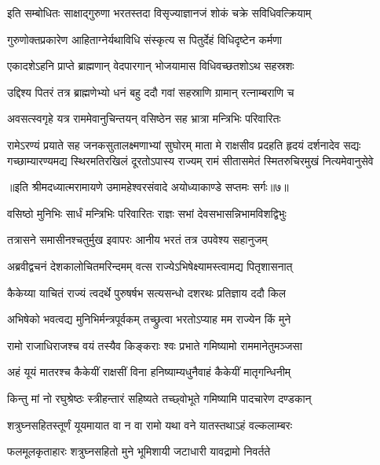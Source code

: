 \twolineshloka
{इति सम्बोधितः साक्षाद्गुरुणा भरतस्तदा}
{विसृज्याज्ञानजं शोकं चक्रे सविधिवत्क्रियाम्} %

\twolineshloka
{गुरुणोक्तप्रकारेण आहिताग्नेर्यथाविधि}
{संस्कृत्य स पितुर्देहं विधिदृष्टेन कर्मणा} %

\twolineshloka
{एकादशेऽहनि प्राप्ते ब्राह्मणान् वेदपारगान्}
{भोजयामास विधिवच्छतशोऽथ सहस्रशः} %

\twolineshloka
{उद्दिश्य पितरं तत्र ब्राह्मणेभ्यो धनं बहु}
{ददौ गवां सहस्राणि ग्रामान् रत्नाम्बराणि च} %

\twolineshloka
{अवसत्स्वगृहे यत्र राममेवानुचिन्तयन्}
{वसिष्ठेन सह भ्रात्रा मन्त्रिभिः परिवारितः} %

\fourlineindentedshloka
{रामेऽरण्यं प्रयाते सह जनकसुतालक्ष्मणाभ्यां सुघोरम्}
{माता मे राक्षसीव प्रदहति हृदयं दर्शनादेव सद्यः}
{गच्छाम्यारण्यमद्य स्थिरमतिरखिलं दूरतोऽपास्य राज्यम्}
{रामं सीतासमेतं स्मितरुचिरमुखं नित्यमेवानुसेवे} %

{॥इति श्रीमदध्यात्मरामायणे उमामहेश्वरसंवादे
अयोध्याकाण्डे सप्तमः सर्गः॥७॥
}




\twolineshloka
{वसिष्ठो मुनिभिः सार्धं मन्त्रिभिः परिवारितः}
{राज्ञः सभां देवसभासन्निभामविशद्विभुः} %

\twolineshloka
{तत्रासने समासीनश्चतुर्मुख इवापरः}
{आनीय भरतं तत्र उपवेश्य सहानुजम्} %

\twolineshloka
{अब्रवीद्वचनं देशकालोचितमरिन्दमम्}
{वत्स राज्येऽभिषेक्ष्यामस्त्वामद्य पितृशासनात्} %

\twolineshloka
{कैकेय्या याचितं राज्यं त्वदर्थे पुरुषर्षभ}
{सत्यसन्धो दशरथः प्रतिज्ञाय ददौ किल} %

\twolineshloka
{अभिषेको भवत्वद्य मुनिभिर्मन्त्रपूर्वकम्}
{तच्छ्रुत्वा भरतोऽप्याह मम राज्येन किं मुने} %

\twolineshloka
{रामो राजाधिराजश्च वयं तस्यैव किङ्कराः}
{श्वः प्रभाते गमिष्यामो राममानेतुमञ्जसा} %

\twolineshloka
{अहं यूयं मातरश्च कैकेयीं राक्षसीं विना}
{हनिष्याम्यधुनैवाहं कैकेयीं मातृगन्धिनीम्} %

\twolineshloka
{किन्तु मां नो रघुश्रेष्ठः स्त्रीहन्तारं सहिष्यते}
{तच्छ्वोभूते गमिष्यामि पादचारेण दण्डकान्} %

\twolineshloka
{शत्रुघ्नसहितस्तूर्णं यूयमायात वा न वा}
{रामो यथा वने यातस्तथाऽहं वल्कलाम्बरः} %

\twolineshloka
{फलमूलकृताहारः शत्रुघ्नसहितो मुने}
{भूमिशायी जटाधारी यावद्रामो निवर्तते} %

